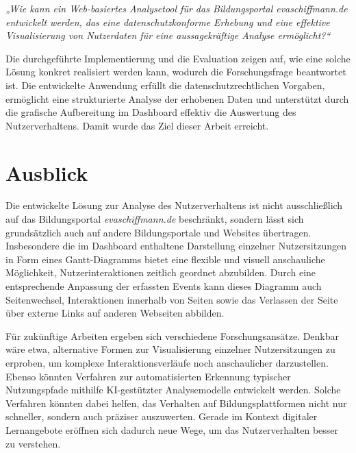 \textit{„Wie kann ein Web-basiertes Analysetool für das Bildungsportal \textit{evaschiffmann.de} entwickelt werden, das eine datenschutzkonforme Erhebung und eine effektive Visualisierung von Nutzerdaten für eine aussagekräftige Analyse ermöglicht?“}

Die durchgeführte Implementierung und die Evaluation zeigen auf, wie eine solche Lösung konkret realisiert werden kann, wodurch die Forschungsfrage beantwortet ist. Die entwickelte Anwendung erfüllt die datenschutzrechtlichen Vorgaben, ermöglicht eine strukturierte Analyse der erhobenen Daten und unterstützt durch die grafische Aufbereitung im Dashboard effektiv die Auswertung des Nutzerverhaltens. Damit wurde das Ziel dieser Arbeit erreicht.

\section{Ausblick}
Die entwickelte Lösung zur Analyse des Nutzerverhaltens ist nicht ausschließlich auf das Bildungsportal \textit{evaschiffmann.de} beschränkt, sondern lässt sich grundsätzlich auch auf andere Bildungsportale und Websites übertragen. Insbesondere die im Dashboard enthaltene Darstellung einzelner Nutzersitzungen in Form eines Gantt-Diagramms bietet eine flexible und visuell anschauliche Möglichkeit, Nutzerinteraktionen zeitlich geordnet abzubilden. Durch eine entsprechende Anpassung der erfassten Events kann dieses Diagramm auch Seitenwechsel, Interaktionen innerhalb von Seiten sowie das Verlassen der Seite über externe Links auf anderen Webseiten abbilden.

Für zukünftige Arbeiten ergeben sich verschiedene Forschungsansätze. Denkbar wäre etwa, alternative Formen zur Visualisierung einzelner Nutzersitzungen zu erproben, um komplexe Interaktionsverläufe noch anschaulicher darzustellen. Ebenso könnten Verfahren zur automatisierten Erkennung typischer Nutzungspfade mithilfe KI-gestützter Analysemodelle entwickelt werden. Solche Verfahren könnten dabei helfen, das Verhalten auf Bildungsplattformen nicht nur schneller, sondern auch präziser auszuwerten. Gerade im Kontext digitaler Lernangebote eröffnen sich dadurch neue Wege, um das Nutzerverhalten besser zu verstehen. 



